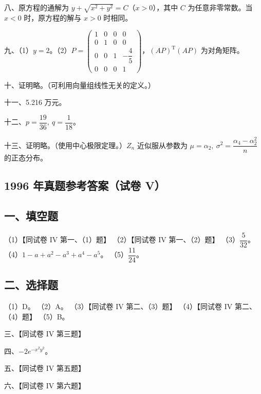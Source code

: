 \documentclass[UTF8,12pt]{ctexart}
\begin{document}
八、原方程的通解为 \(\displaystyle y+\sqrt{x^2+y^2}=C\)（\(\displaystyle x>0\)），其中 \(\displaystyle C\) 为任意非零常数。当 \(\displaystyle x<0\) 时，原方程的解与 \(\displaystyle x>0\) 时相同。


九、（1）\(\displaystyle y=2\)。（2）\(\displaystyle P=\begin{pmatrix}1&0&0&0\\0&1&0&0\\0&0&1&-\dfrac{\displaystyle 4}{\displaystyle 5}\\0&0&0&1\end{pmatrix}\)，\(\displaystyle (AP)^{\mathrm T}(AP)\) 为对角矩阵。


十、证明略。（可利用向量组线性无关的定义。）


十一、5.216 万元。


十二、\(\displaystyle p=\dfrac{\displaystyle 19}{\displaystyle 36},\allowbreak \ q=\dfrac{\displaystyle 1}{\displaystyle 18}\)。


十三、证明略。（使用中心极限定理。）\(\displaystyle Z_n\) 近似服从参数为 \(\displaystyle \mu=\alpha_2,\allowbreak \ \sigma^2=\dfrac{\displaystyle \alpha_4-\alpha_2^2}{\displaystyle n}\) 的正态分布。


\subsection*{1996 年真题参考答案（试卷 V）}

\subsection*{一、填空题}

（1）【同试卷 IV 第一、（1）题】 （2）【同试卷 IV 第一、（2）题】 （3）\(\displaystyle \dfrac{\displaystyle 5}{\displaystyle 32}\)。 （4）\(\displaystyle 1-a+a^2-a^3+a^4-a^5\)。 （5）\(\displaystyle \dfrac{\displaystyle 11}{\displaystyle 24}\)。


\subsection*{二、选择题}

（1）D。 （2）A。 （3）【同试卷 IV 第二、（3）题】 （4）【同试卷 IV 第二、（4）题】 （5）B。


三、【同试卷 IV 第三题】


四、\(\displaystyle -2e^{-x^2y^2}\)。


五、【同试卷 IV 第五题】


六、【同试卷 IV 第六题】
\end{document}
